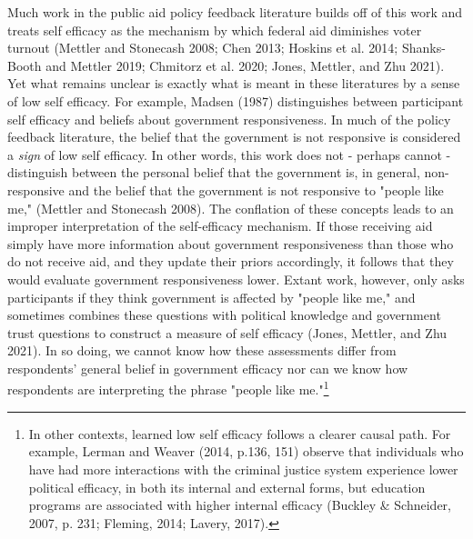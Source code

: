 \documentclass[12pt]{paper}
\begin{document}
Much work in the public aid policy feedback literature builds off of this work and treats self efficacy as the mechanism by which federal aid diminishes voter turnout (Mettler and Stonecash 2008; Chen 2013; Hoskins et al. 2014; Shanks-Booth and Mettler 2019; Chmitorz et al. 2020; Jones, Mettler, and Zhu 2021). Yet what remains unclear is exactly what is meant in these literatures by a sense of low self efficacy. For example, Madsen (1987) distinguishes between participant self efficacy and beliefs about government responsiveness. In much of the policy feedback literature, the belief that the government is not responsive is considered a \textit{sign} of low self efficacy. In other words, this work does not - perhaps cannot - distinguish between the personal belief that the government is, in general, non-responsive and the belief that the government is not responsive to "people like me," (Mettler and Stonecash 2008). The conflation of these concepts leads to an improper interpretation of the self-efficacy mechanism. If those receiving aid simply have more information about government responsiveness than those who do not receive aid, and they update their priors accordingly, it follows that they would evaluate government responsiveness lower. Extant work, however, only asks participants if they think government is affected by "people like me," and sometimes combines these questions with political knowledge and government trust questions to construct a measure of self efficacy (Jones, Mettler, and Zhu 2021). In so doing, we cannot know how these assessments differ from respondents' general belief in government efficacy nor can we know how respondents are interpreting the phrase "people like me."\footnote{In other contexts, learned low self efficacy follows a clearer causal path. For example, Lerman and Weaver (2014, p.136, 151) observe that individuals who have had more interactions with the criminal justice system experience lower political efficacy, in both its internal and external forms, but education programs are associated with higher internal efficacy (Buckley & Schneider, 2007, p. 231; Fleming, 2014; Lavery, 2017).}
\end{document}
